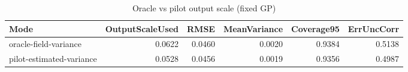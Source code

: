 \begin{table}
\caption{Oracle vs pilot output scale (fixed GP)}
\label{tab:outputscale_comparison}
\begin{tabular}{lrrrrr}
\toprule
Mode & OutputScaleUsed & RMSE & MeanVariance & Coverage95 & ErrUncCorr \\
\midrule
oracle-field-variance & 0.0622 & 0.0460 & 0.0020 & 0.9384 & 0.5138 \\
pilot-estimated-variance & 0.0528 & 0.0456 & 0.0019 & 0.9356 & 0.4987 \\
\bottomrule
\end{tabular}
\end{table}
